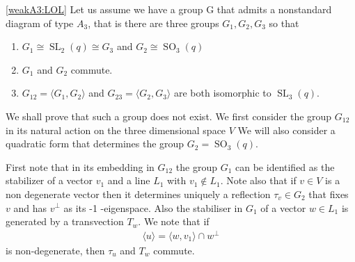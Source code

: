 \documentclass[12pt]{amsart}
\theoremstyle{definition}
\newcommand{\bpf}{\noindent{\bf Proof}\hspace{7pt}}
\DeclareMathOperator{\SL}{SL}
\DeclareMathOperator{\SO}{SO}
\newcommand{\amgrpG}{{\mathbf{G}}}
\newcommand{\amG}{{\mathscr{G}}}
\begin{document}
\bpf
%

\eqref{weakA3:LOL}
Let us assume we have a group G that admits a nonstandard diagram of type $A_{3}$, that is there are three groups $G_{1}, G_{2}, G_{3}$  so that 

\begin{enumerate}
\item $G_{1}\cong \SL_2(q)\cong G_{3}$ and $G_{2}\cong\SO_{3}(q)$
\item $G_{1}$ and $G_{2}$ commute.
\item $G_{12}=\langle G_{1}, G_{2}\rangle $ and $G_{23}=\langle G_{2}, G_{3}\rangle $ are both isomorphic to $\SL_{3}(q)$.
\end{enumerate}


We shall prove that such a group does not exist. We first consider the group $G_{12}$ in its natural action on the three dimensional space $V$ We will also consider a quadratic form that determines the group $G_{2}=\SO_{3}(q)$.

First note that in its embedding in $G_{12}$ the group $G_{1}$ can be identified as the stabilizer of a vector $v_{1}$ and a line $L_{1}$ with $v_{1}\not\in L_{1}$. Note also that if $v \in V$ is a non degenerate vector then it determines uniquely a reflection $\tau_{v }\in G_{2}$ that fixes $v$ and has $v^{\perp}$ as its -1 -eigenspace. Also the stabiliser in $G_{1}$ of a vector $w \in L_{1}$ is generated by a transvection $T_{w}$. We note that if 
\begin{align*}
\langle u\rangle = \langle w , v_{1}\rangle \cap w^{\perp}
\end{align*}
 is non-degenerate, then $\tau_{u}$ and $T_{w}$ commute.
\end{document}
